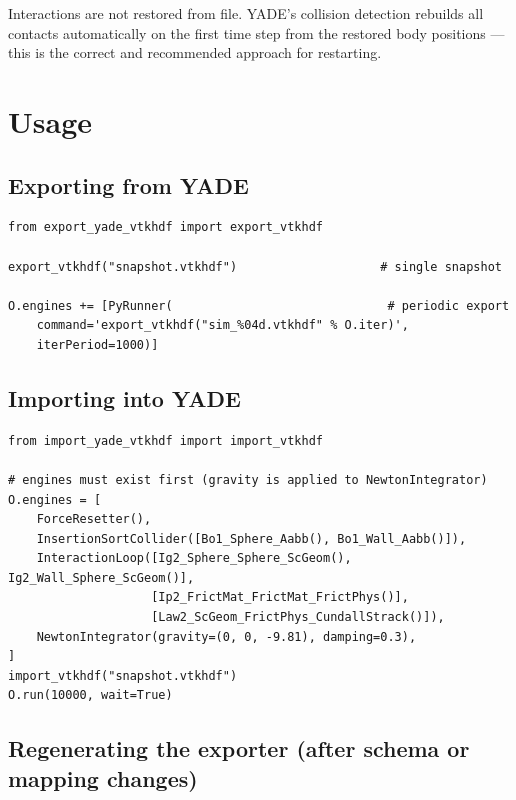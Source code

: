 \documentclass[10pt,a4paper]{article}
\begin{document}
\begin{notebox}
Interactions are not restored from file. YADE's collision detection rebuilds
all contacts automatically on the first time step from the restored body
positions — this is the correct and recommended approach for restarting.
\end{notebox}

\section{Usage}

\subsection{Exporting from YADE}

\begin{lstlisting}[style=py]
from export_yade_vtkhdf import export_vtkhdf

export_vtkhdf("snapshot.vtkhdf")                    # single snapshot

O.engines += [PyRunner(                              # periodic export
    command='export_vtkhdf("sim_%04d.vtkhdf" % O.iter)',
    iterPeriod=1000)]
\end{lstlisting}

\subsection{Importing into YADE}

\begin{lstlisting}[style=py]
from import_yade_vtkhdf import import_vtkhdf

# engines must exist first (gravity is applied to NewtonIntegrator)
O.engines = [
    ForceResetter(),
    InsertionSortCollider([Bo1_Sphere_Aabb(), Bo1_Wall_Aabb()]),
    InteractionLoop([Ig2_Sphere_Sphere_ScGeom(), Ig2_Wall_Sphere_ScGeom()],
                    [Ip2_FrictMat_FrictMat_FrictPhys()],
                    [Law2_ScGeom_FrictPhys_CundallStrack()]),
    NewtonIntegrator(gravity=(0, 0, -9.81), damping=0.3),
]
import_vtkhdf("snapshot.vtkhdf")
O.run(10000, wait=True)
\end{lstlisting}

\subsection{Regenerating the exporter (after schema or mapping changes)}
\end{document}
